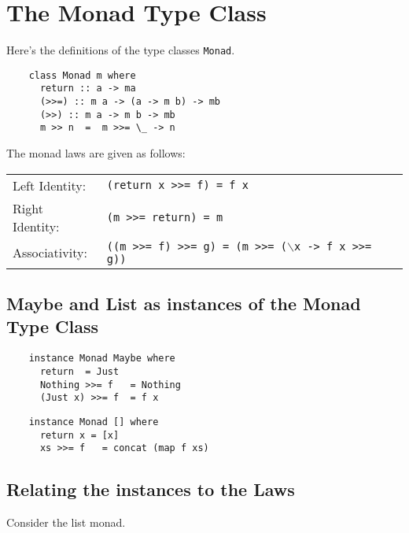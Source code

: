 \documentclass[11pt]{article}
\begin{document}


\section{The Monad Type Class}
Here's the definitions of the type classes {\tt{Monad}}.

\begin{verbatim}
    class Monad m where
      return :: a -> ma
      (>>=) :: m a -> (a -> m b) -> mb
      (>>) :: m a -> m b -> mb
      m >> n  =  m >>= \_ -> n
\end{verbatim}

\noindent{}The monad laws are given as follows:\\

\begin{tabular}{ll}
Left Identity: & {\tt{(return x >>= f) = f x}} \\
Right Identity: & {\tt{(m >>= return)  = m}} \\
Associativity: & {\tt{((m >>= f) >>= g) = (m >>= ($\backslash$x -> f x >>= g))}} \\
\end{tabular}

\subsection{Maybe and List as instances of the Monad Type Class}

\begin{verbatim}
    instance Monad Maybe where
      return  = Just
      Nothing >>= f   = Nothing
      (Just x) >>= f  = f x
\end{verbatim}

\begin{verbatim}
    instance Monad [] where
      return x = [x]
      xs >>= f   = concat (map f xs)
\end{verbatim}


\subsection{Relating the instances to the Laws}

Consider the list monad. 
\end{document}
